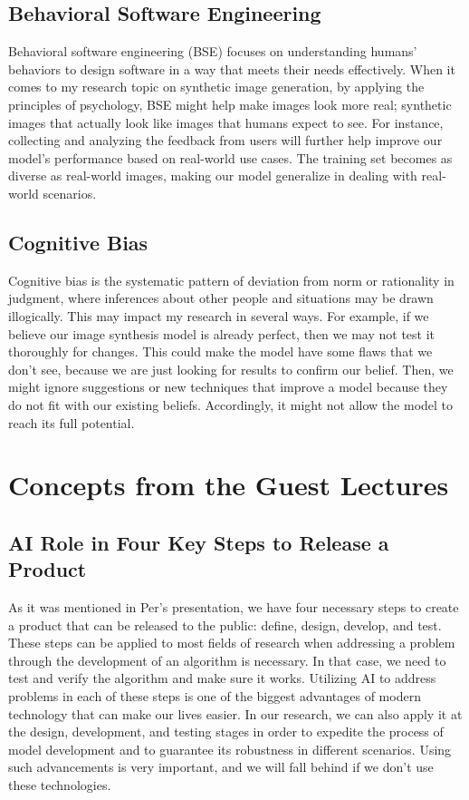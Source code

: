 \documentclass[11pt]{article}
\begin{document}
 
\subsection{Behavioral Software Engineering}

Behavioral software engineering (BSE) focuses on understanding humans' behaviors to design software in a way that meets their needs effectively. When it comes to my research topic on synthetic image generation, by applying the principles of psychology, BSE might help make images look more real; synthetic images that actually look like images that humans expect to see. For instance, collecting and analyzing the feedback from users will further help improve our model's performance based on real-world use cases. The training set becomes as diverse as real-world images, making our model generalize in dealing with real-world scenarios.
 


\subsection{Cognitive Bias}

Cognitive bias is the systematic pattern of deviation from norm or rationality in judgment, where inferences about other people and situations may be drawn illogically. This may impact my research in several ways. For example, if we believe our image synthesis model is already perfect, then we may not test it thoroughly for changes. This could make the model have some flaws that we don't see, because we are just looking for results to confirm our belief. Then, we might ignore suggestions or new techniques that improve a model because they do not fit with our existing beliefs. Accordingly, it might not allow the model to reach its full potential.


\section{Concepts from the Guest Lectures}


\subsection{AI Role in Four Key Steps to Release a Product }

As it was mentioned in Per's presentation, we have four necessary steps to create a product that can be released to the public: define, design, develop, and test. These steps can be applied to most fields of research when addressing a problem through the development of an algorithm is necessary. In that case, we need to test and verify the algorithm and make sure it works. Utilizing AI to address problems in each of these steps is one of the biggest advantages of modern technology that can make our lives easier. In our research, we can also apply it at the design, development, and testing stages in order to expedite the process of model development and to guarantee its robustness in different scenarios. Using such advancements is very important, and we will fall behind if we don't use these technologies.
\end{document}
